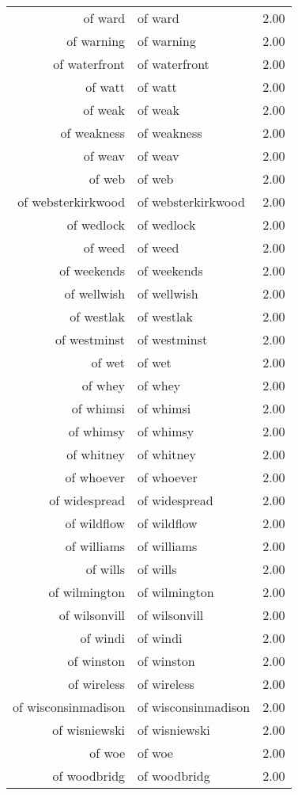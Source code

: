 \begin{table}[ht]
\begin{tabular}{rlr}
  of ward & of ward & 2.00 \\ 
  of warning & of warning & 2.00 \\ 
  of waterfront & of waterfront & 2.00 \\ 
  of watt & of watt & 2.00 \\ 
  of weak & of weak & 2.00 \\ 
  of weakness & of weakness & 2.00 \\ 
  of weav & of weav & 2.00 \\ 
  of web & of web & 2.00 \\ 
  of websterkirkwood & of websterkirkwood & 2.00 \\ 
  of wedlock & of wedlock & 2.00 \\ 
  of weed & of weed & 2.00 \\ 
  of weekends & of weekends & 2.00 \\ 
  of wellwish & of wellwish & 2.00 \\ 
  of westlak & of westlak & 2.00 \\ 
  of westminst & of westminst & 2.00 \\ 
  of wet & of wet & 2.00 \\ 
  of whey & of whey & 2.00 \\ 
  of whimsi & of whimsi & 2.00 \\ 
  of whimsy & of whimsy & 2.00 \\ 
  of whitney & of whitney & 2.00 \\ 
  of whoever & of whoever & 2.00 \\ 
  of widespread & of widespread & 2.00 \\ 
  of wildflow & of wildflow & 2.00 \\ 
  of williams & of williams & 2.00 \\ 
  of wills & of wills & 2.00 \\ 
  of wilmington & of wilmington & 2.00 \\ 
  of wilsonvill & of wilsonvill & 2.00 \\ 
  of windi & of windi & 2.00 \\ 
  of winston & of winston & 2.00 \\ 
  of wireless & of wireless & 2.00 \\ 
  of wisconsinmadison & of wisconsinmadison & 2.00 \\ 
  of wisniewski & of wisniewski & 2.00 \\ 
  of woe & of woe & 2.00 \\ 
  of woodbridg & of woodbridg & 2.00 \\ 

\end{tabular}
\end{table}
